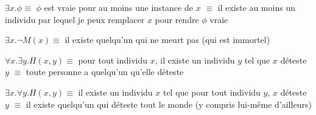 \begin{frame}
	 
	$\exists x. \phi \equiv$ $\phi$ est vraie pour au moins une instance de $x$ $\equiv$ il existe au moins un individu par lequel je peux remplacer $x$ pour rendre $\phi$ vraie\pause\newline
	
	$\exists x. \neg M(x) \equiv$ \pause il existe quelqu'un qui ne meurt pas (qui est immortel)\pause\newline
	
	$\forall x. \exists y. H(x,y) \equiv$ \pause pour tout individu $x$, il existe un individu $y$ tel que $x$ déteste $y$ $\equiv$ \pause toute personne a quelqu'un qu'elle déteste\pause\newline
	
	$\exists x. \forall y. H(x,y) \equiv$ \pause il existe un individu $x$ tel que pour tout individu $y$, $x$ déteste $y$ $\equiv$ \pause il existe quelqu'un qui déteste tout le monde \pause (y compris lui-même d'ailleurs)

	\end{frame}
	
	
	
%
%
%
%
%
%
%
%	
%	
%	
%		 
%
%	

